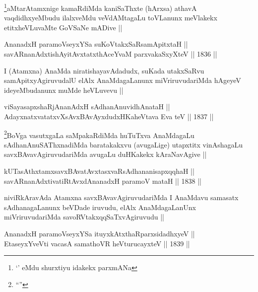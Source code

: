 \begin{artha}
\footnote[2]{`\stext' eMdu shurxtiyu idakekx parxmANa}aMtarAtamxnige kamaRdiMda kaniSaThxte (hArxsa) athavA vaqdidhxyeMbudu
ilalxveMdu veVdAMtagaLu toVLanunx meVlakekx etitxheVLuvaMte GoVSaNe
mADive ||
\end{artha}


\begin{shl}
AnanadxH paramoV\s seyxYSa suKoVtakxSaRsamApitxtaH || \\
savARnanAdxtishAyitAvxtatxthAceYvaM parxvakaSxyXteV ||  1836 ||  
\end{shl}

\begin{artha}
I (Atamxna) AnaMda niratishayavAdadudx, suKada utakxSaRvu
samApitxyAgiruvudalU elAlx AnaMdagaLanunx miVriruvudariMda hAgeyeV
ideyeMbudanunx muMde heVLuvevu ||
\end{artha}

\begin{shl}
viSayasapxshaRjAnanAdxH sAdhanAnuvidhAnataH || \\
AdayxnatxvatatxvXsAvxBAvAyxdudxHKaheVtava Eva teV ||  1837 ||  
\end{shl}

\begin{artha}
\footnote[1]{``\stext''}BoVga vasutxgaLa saMpakaRdiMda huTuTxva AnaMdagaLu
sAdhanAnuSAThxnadiMda baratakakxvu (avugaLige) utapxtitx vinAshagaLu
savxBAvavAgiruvudariMda avugaLu duHKakekx kAraNavAgive ||
\end{artha}

\begin{shl}
kUTasAthxtamxsavxBAvatAvxtasxvaRsAdhananisapxqqhaH || \\
savARnanAdxtivatiRtAvxdAnanadxH paramoV mataH ||  1838 ||  
\end{shl}

\begin{artha}
niviRkAravAda Atamxna savxBAvavAgiruvudariMda I AnaMdavu samasatx
sAdhanagaLanunx beVDade iruvudu, elAlx AnaMdagaLanUnx miVriruvudariMda
savoRVtakxqqSaTxvAgiruvudu ||
\end{artha}


\begin{shl}
AnanadxH paramoV\s seyxYSa ituyxkAtxthaRparxsidadhxyeV || \\
EtaseyxYveVti vacasA samathoVR heVturucayxteV ||  1839 ||  
\end{shl}

